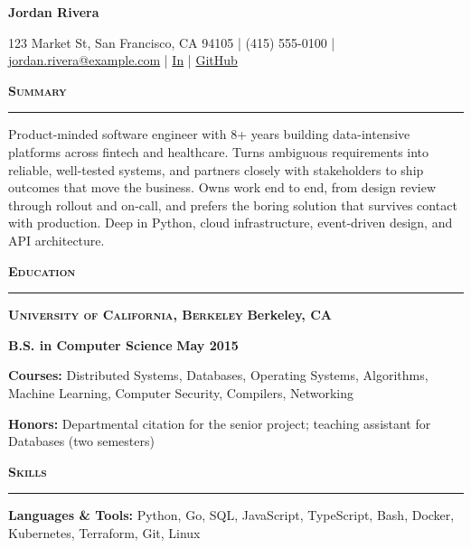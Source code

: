 \documentclass{article}
\newcommand{\vs}{\vspace{0.3cm}}
\begin{document}
\begin{center}
	\textbf{\LARGE Jordan Rivera}

	123 Market St, San Francisco, CA 94105 | (415) 555-0100 | \href{mailto:jordan.rivera@example.com}{jordan.rivera@example.com} | \href{https://www.linkedin.com/in/jordanrivera/}{In} | \href{https://github.com/jordanrivera}{GitHub}
\end{center}

\noindent \textbf{\textsc{\large Summary}}

\noindent \rule[3pt]{\textwidth}{1pt}

\noindent Product-minded software engineer with 8+ years building data-intensive platforms across fintech and healthcare. Turns ambiguous requirements into reliable, well-tested systems, and partners closely with stakeholders to ship outcomes that move the business. Owns work end to end, from design review through rollout and on-call, and prefers the boring solution that survives contact with production. Deep in Python, cloud infrastructure, event-driven design, and API architecture.
\vs

\noindent \textbf{\textsc{\large Education}}

\noindent \rule[3pt]{\textwidth}{1pt}

\noindent \textbf{\textsc{University of California, Berkeley}} \hfill \textbf{Berkeley, CA}

\noindent \textbf{B.S. in Computer Science} \hfill \textbf{May 2015}

\noindent \textbf{Courses:} Distributed Systems, Databases, Operating Systems, Algorithms, Machine Learning, Computer Security, Compilers, Networking

\noindent \textbf{Honors:} Departmental citation for the senior project; teaching assistant for Databases (two semesters)
\vs

\noindent \textbf{\textsc{\large Skills}}

\noindent \rule[3pt]{\textwidth}{1pt}

\noindent \textbf{Languages \& Tools:} Python, Go, SQL, JavaScript, TypeScript, Bash, Docker, Kubernetes, Terraform, Git, Linux
\end{document}
